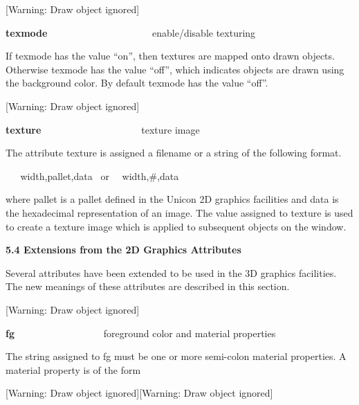 \documentclass[letterpaper]{article}
\begin{document}
\bigskip

[Warning: Draw object ignored]

{
\textsf{\textbf{texmode}} \ \ \ \ \ \ \ \ \ \ \ \ \ \  \ \ \ \ \ \ \ enable/disable texturing \ }


\bigskip

{
If texmode has the value \textsf{{}``on'',} then textures are mapped onto drawn objects. Otherwise texmode has the value
\textsf{{}``off''}, which indicates objects are drawn using the background color. By default texmode has the value
\textsf{{}``off''.}}

[Warning: Draw object ignored]

{
\textsf{\textbf{texture}}\textbf{\ \ \ \ \ \ \ \ \ \ \ \ \ \ \ \ \ \ }texture image }


\bigskip

{
The attribute texture is assigned a filename or a string of the following format.}

{
\texttt{\ \ \ }\textsf{width,pallet,data} \ or \ \ \textsf{width,\#,data}}

{
where pallet is a pallet defined in the Unicon 2D graphics facilities and data is the hexadecimal representation of an
image. The value assigned to texture is used to create a texture image which is applied to subsequent objects on the
window. \ }


\bigskip


\bigskip

{\bfseries
5.4 Extensions from the 2D Graphics Attributes}


\bigskip

{
Several attributes have been extended to be used in the 3D graphics facilities. The new meanings of these attributes are
described in this section. \ }


\bigskip

[Warning: Draw object ignored]

{
\textsf{\textbf{fg\ \ \ \ \ \ \ \ \ \ \ \  \ \ \ \ }}foreground color and material properties}


\bigskip

{
The string assigned to fg must be one or more semi-colon material properties. A material property is of the form }

[Warning: Draw object ignored][Warning: Draw object ignored]
\end{document}
